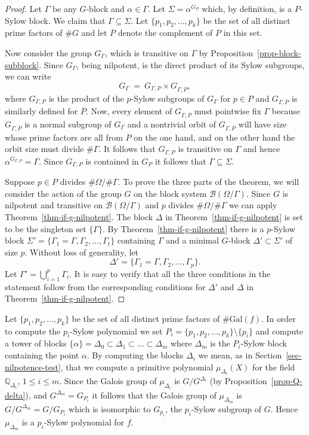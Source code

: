 \documentclass[prodmod,acmtalg]{acmsmall}
\newcommand{\Gal}[1]{{\ensuremath{\mathrm{Gal}\left(#1\right)}}}
\newcommand{\Blocks}[1]{{\ensuremath{\mathcal{B}\left(#1\right)}}}
\newcommand{\Q}{\ensuremath{\mathbb{Q}}}
\begin{document}
\begin{proof}
  Let $\Gamma$ be any $G$-block and $\alpha\in\Gamma$. Let
  $\Sigma=\alpha^{G_P}$ which, by definition, is a $P$-Sylow block.
  We claim that $\Gamma\subseteq \Sigma$. Let $\{p_1,p_2,\ldots,p_k\}$
  be the set of all distinct prime factors of $\# G$ and let
  $\overline{P}$ denote the complement of $P$ in this set.

  Now consider the group $G_\Gamma$, which is transitive on $\Gamma$
  by Proposition~\ref{prop-block-subblock}. Since $G_\Gamma$, being
  nilpotent, is the direct product of its Sylow subgroups, we can
  write
\[
G_\Gamma~=~G_{\Gamma,P}\times G_{\Gamma,\overline{P}},
\]
where $G_{\Gamma,P}$ is the product of the $p$-Sylow subgroups of
$G_\Gamma$ for $p\in P$ and $G_{\Gamma,\overline{P}}$ is similarly
defined for $\overline{P}$. Now, every element of
$G_{\Gamma,\overline{P}}$ must pointwise fix $\Gamma$ because
$G_{\Gamma,\overline{P}}$ is a normal subgroup of $G_\Gamma$ and a
nontrivial orbit of $G_{\Gamma,\overline{P}}$ will have size whose
prime factors are all from $\overline{P}$ on the one hand, and on the
other hand the orbit size must divide $\# \Gamma$. It follows that
$G_{\Gamma,P}$ is transitive on $\Gamma$ and hence
$\alpha^{G_{\Gamma,P}}=\Gamma$. Since $G_{\Gamma,P}$ is contained in
$G_P$ it follows that $\Gamma\subseteq \Sigma$.

Suppose $p\in P$ divides $\# \Omega/\# \Gamma$. To prove the three
parts of the theorem, we will consider the action of the group $G$ on
the block system $\Blocks{\Omega/\Gamma}$. Since $G$ is nilpotent and
transitive on $\Blocks{\Omega/\Gamma}$ and $p$ divides $\# \Omega/\#
\Gamma$ we can apply Theorem~\ref{thm-if-g-nilpotent}. The block
$\Delta$ in Theorem~\ref{thm-if-g-nilpotent} is set to be the
singleton set $\{\Gamma\}$. By Theorem~\ref{thm-if-g-nilpotent} there
is a $p$-Sylow block
$\Sigma'=\{\Gamma_1=\Gamma,\Gamma_2,\ldots,\Gamma_t\}$ containing
$\Gamma$ and a minimal $G$-block $\Delta'\subset \Sigma'$ of size $p$.
Without loss of generality, let
\[
\Delta'=\{\Gamma_1=\Gamma,\Gamma_2,\ldots,\Gamma_p\}.
\]
Let $\Gamma'=\bigcup_{i=1}^p\Gamma_i$. It is easy to verify that all
the three conditions in the statement follow from the corresponding
conditions for $\Delta'$ and $\Delta$ in
Theorem~\ref{thm-if-g-nilpotent}.
\end{proof}

Let $\{p_1,p_2,\ldots,p_k\}$ be the set of all distinct prime factors
of $\# \Gal{f}$. In order to compute the $p_i$-Sylow polynomial we set
$P_i=\{p_1,p_2,\ldots,p_k\}\setminus\{p_i\}$ and compute a tower of
blocks $\{\alpha\}=\Delta_0\subset \Delta_1\subset\ldots\subset
\Delta_m$ where $\Delta_m$ is the $P_i$-Sylow block containing the
point $\alpha$. By computing the blocks $\Delta_i$ we mean, as in
Section~\ref{sec-nilpotence-test}, that we compute a primitive
polynomial $\mu_{\Delta_i}(X)$ for the field $\Q_{\Delta_i}$, $1\leq
i\leq m$. Since the Galois group of $\mu_{\Delta_i}$ is
$G/G^{\Delta_i}$ (by Proposition~\ref{prop-Q-delta}), and
$G^{\Delta_m}=G_{P_i}$ it follows that the Galois group of
$\mu_{\Delta_m}$ is $G/G^{\Delta_m}=G/G_{P_i}$ which is isomorphic to
$G_{p_i}$, the $p_i$-Sylow subgroup of $G$. Hence $\mu_{\Delta_m}$ is
a $p_i$-Sylow polynomial for $f$.
\end{document}
